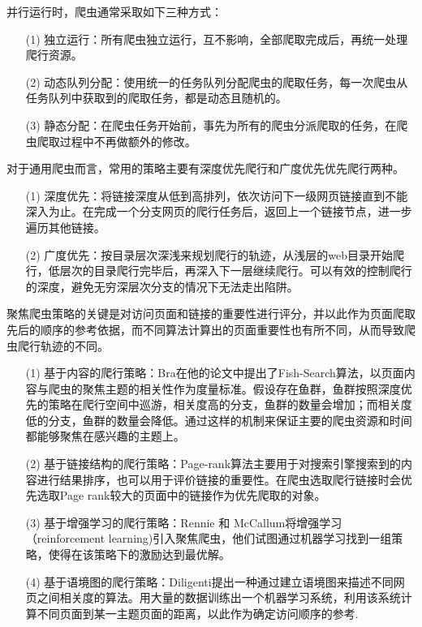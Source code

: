 \documentclass[doctor,privacy,twoside]{buaa_mac}
\begin{document}
并行运行时，爬虫通常采取如下三种方式：
\begin{itemize}
\item[(1)] 独立运行：所有爬虫独立运行，互不影响，全部爬取完成后，再统一处理爬行资源。
\item[(2)] 动态队列分配：使用统一的任务队列分配爬虫的爬取任务，每一次爬虫从任务队列中获取到的爬取任务，都是动态且随机的。
\item[(3)] 静态分配：在爬虫任务开始前，事先为所有的爬虫分派爬取的任务，在爬虫爬取过程中不再做额外的修改。
\end{itemize}

对于通用爬虫而言，常用的策略主要有深度优先爬行和广度优先优先爬行两种。
\begin{itemize}
\item[(1)] 深度优先：将链接深度从低到高排列，依次访问下一级网页链接直到不能深入为止。在完成一个分支网页的爬行任务后，返回上一个链接节点，进一步遍历其他链接。
\item[(2)] 广度优先：按目录层次深浅来规划爬行的轨迹，从浅层的web目录开始爬行，低层次的目录爬行完毕后，再深入下一层继续爬行。可以有效的控制爬行的深度，避免无穷深层次分支的情况下无法走出陷阱。
\end{itemize}

聚焦爬虫策略的关键是对访问页面和链接的重要性进行评分，并以此作为页面爬取先后的顺序的参考依据，而不同算法计算出的页面重要性也有所不同，从而导致爬虫爬行轨迹的不同。

\begin{itemize}
\item[(1)] 基于内容的爬行策略：Bra在他的论文中提出了Fish-Search算法，以页面内容与爬虫的聚焦主题的相关性作为度量标准。假设存在鱼群，鱼群按照深度优先的策略在爬行空间中巡游，相关度高的分支，鱼群的数量会增加；而相关度低的分支，鱼群的数量会降低。通过这样的机制来保证主要的爬虫资源和时间都能够聚焦在感兴趣的主题上。 
\item[(2)] 基于链接结构的爬行策略：Page-rank算法主要用于对搜索引擎搜索到的内容进行结果排序，也可以用于评价链接的重要性。在爬虫选取爬行链接时会优先选取Page rank较大的页面中的链接作为优先爬取的对象。
\item[(3)] 基于增强学习的爬行策略：Rennie 和 McCallum将增强学习（reinforcement learning)引入聚焦爬虫，他们试图通过机器学习找到一组策略，使得在该策略下的激励达到最优解。
\item[(4)] 基于语境图的爬行策略：Diligenti提出一种通过建立语境图来描述不同网页之间相关度的算法。用大量的数据训练出一个机器学习系统，利用该系统计算不同页面到某一主题页面的距离，以此作为确定访问顺序的参考.
\end{itemize}
\end{document}
